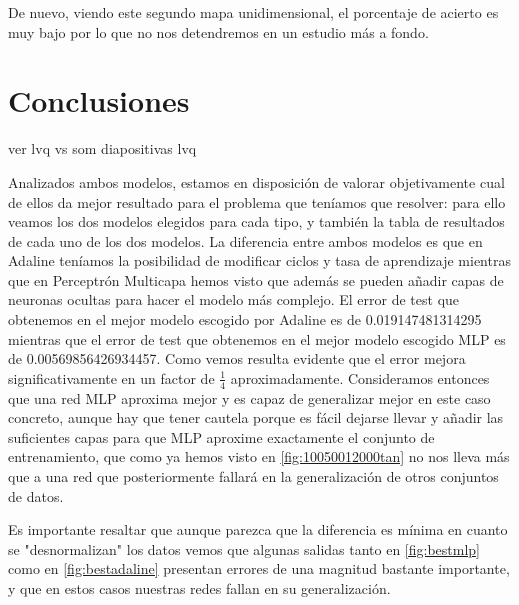 \documentclass[11pt,spanish,listoffigures,listoftables]{workluis}
\begin{document}
\par De nuevo, viendo este segundo mapa unidimensional, el porcentaje de acierto es muy bajo por lo que no nos detendremos en un estudio más a fondo.





\chapter{Conclusiones}

ver lvq vs som diapositivas lvq

\par Analizados ambos modelos, estamos en disposición de valorar objetivamente cual de ellos da mejor resultado para el problema que teníamos que resolver: para ello veamos los dos modelos elegidos para cada tipo, y también la tabla de resultados de cada uno de los dos modelos. La diferencia entre ambos modelos es que en Adaline teníamos la posibilidad de modificar ciclos y tasa de aprendizaje mientras que en Perceptrón Multicapa hemos visto que además se pueden añadir capas de neuronas ocultas para hacer el modelo más complejo. El error de test que obtenemos en el mejor modelo escogido por Adaline es de 0.019147481314295 mientras que el error de test que obtenemos en el mejor modelo escogido MLP es de 0.00569856426934457. Como vemos resulta evidente que el error mejora significativamente en un factor de $\frac{1}{4}$ aproximadamente. Consideramos entonces que una red MLP aproxima mejor y es capaz de generalizar mejor en este caso concreto, aunque hay que tener cautela porque es fácil dejarse llevar y añadir las suficientes capas para que MLP aproxime exactamente el conjunto de entrenamiento, que como ya hemos visto en \ref{fig:10050012000tan} no nos lleva más que a una red que posteriormente fallará en la generalización de otros conjuntos de datos.

\par Es importante resaltar que aunque parezca que la diferencia es mínima en cuanto se "desnormalizan" los datos vemos que algunas salidas tanto en \ref{fig:bestmlp} como en \ref{fig:bestadaline} presentan errores de una magnitud bastante importante, y que en estos casos nuestras redes fallan en su generalización.
\end{document}
